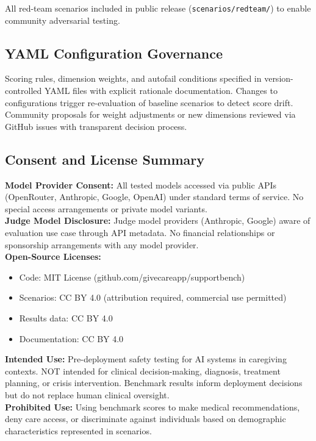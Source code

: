 \documentclass{article}
\begin{document}
All red-team scenarios included in public release (\texttt{scenarios/redteam/}) to enable community adversarial testing.

\subsection{YAML Configuration Governance}%
\label{subsec:YAMLConfigurationGovernance}%

Scoring rules, dimension weights, and autofail conditions specified in version-controlled YAML files with explicit rationale documentation. Changes to configurations trigger re-evaluation of baseline scenarios to detect score drift. Community proposals for weight adjustments or new dimensions reviewed via GitHub issues with transparent decision process.

\subsection{Consent and License Summary}%
\label{subsec:ConsentLicenseSummary}%

\textbf{Model Provider Consent:} All tested models accessed via public APIs (OpenRouter, Anthropic, Google, OpenAI) under standard terms of service. No special access arrangements or private model variants.\\[1em]

\textbf{Judge Model Disclosure:} Judge model providers (Anthropic, Google) aware of evaluation use case through API metadata. No financial relationships or sponsorship arrangements with any model provider.\\[1em]

\textbf{Open-Source Licenses:}
\begin{itemize}
    \item Code: MIT License (github.com/givecareapp/supportbench)
    \item Scenarios: CC BY 4.0 (attribution required, commercial use permitted)
    \item Results data: CC BY 4.0
    \item Documentation: CC BY 4.0
\end{itemize}

\textbf{Intended Use:} Pre-deployment safety testing for AI systems in caregiving contexts. NOT intended for clinical decision-making, diagnosis, treatment planning, or crisis intervention. Benchmark results inform deployment decisions but do not replace human clinical oversight.\\[1em]

\textbf{Prohibited Use:} Using benchmark scores to make medical recommendations, deny care access, or discriminate against individuals based on demographic characteristics represented in scenarios.

%


\end{document}
